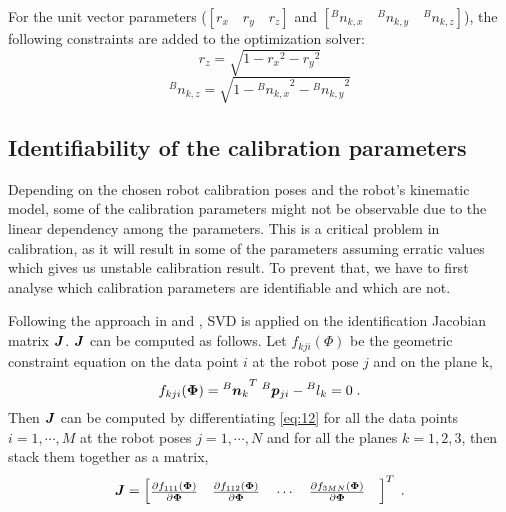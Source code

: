 For the unit vector parameters ($[r_x \quad r_y \quad r_z ]$ and  $[{^B}n_{k,x} \quad {^B}n_{k,y} \quad {^B}n_{k,z}]$), the following constraints are added to the optimization solver:
\begin{equation}
\label{eq:10}
{r_z} = \sqrt{1 - {r_x}^2 - {r_y}^2}
\end{equation}
\begin{equation}
\label{eq:11}
{^B}n_{k,z} = \sqrt{1 - {{^B}n_{k,x}}^2 - {{^B}n_{k,y}}^2}
\end{equation}

\subsection{Identifiability of the calibration parameters}
\label{sec:third_step}

Depending on the chosen robot calibration poses and the robot's kinematic model, some of the calibration parameters might not be observable due to the linear dependency among the parameters. This is a critical problem in calibration, as it will result in some of the parameters assuming erratic values which gives us unstable calibration result. To prevent that, we have to first analyse which calibration parameters are identifiable and which are not. 

Following the approach in \cite{Joubair2015} and \cite{Hollerbach1996}, SVD is applied on the identification Jacobian matrix $\vb*{J}$. $\vb*{J}$ can be computed as follows. Let  $f_{kji}(\Phi)$ be the geometric constraint equation on the data point $i$ at the robot pose $j$ and on the plane k, 
\begin{equation}
\label{eq:12}
 f_{kji}(\vb*{\Phi}) =  {{^B}\vb*{n}_k}^T \; {^B}\vb*{p}_{ji} - {^B}l_k = 0 \; .
\end{equation}
Then $\vb*{J}$ can be computed by differentiating \eqref{eq:12} for all the data points $i = 1, \cdots, M$ at the robot poses $j = 1, \cdots, N$ and for all the planes $k=1,2,3$, then stack them together as a matrix,
\renewcommand\arraystretch{1.5}
\begin{equation}
\vb*{J} = \begin{bmatrix}
 \frac{\partial f_{111}(\vb*{\Phi})}{\partial\vb*{\Phi}} \quad
 \frac{\partial f_{112}(\vb*{\Phi})}{\partial\vb*{\Phi}} \quad
 \cdots  \quad
 \frac{\partial f_{3MN}(\vb*{\Phi})}{\partial\vb*{\Phi}} \quad
	\end{bmatrix} ^T \; .
\end{equation}


